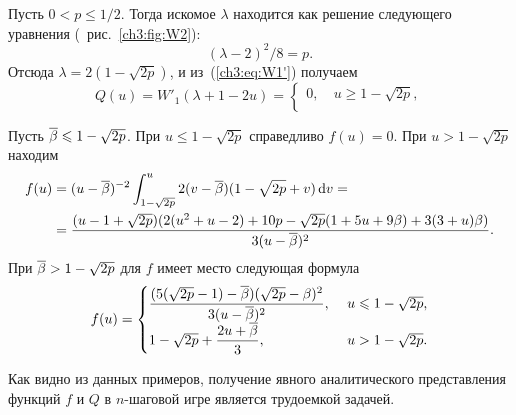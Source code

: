 {\begin{example}
  Пусть $0 < p \leq 1/2$.
  Тогда искомое $\lambda$ находится как решение следующего уравнения (\seename~рис.~\ref{ch3:fig:W2}):
  \begin{equation*}
    (\lambda - 2)^2/8 = p.
  \end{equation*}
  Отсюда $\lambda = 2(1-\sqrt{2p})$, и из~(\ref{ch3:eq:W1'}) получаем
  \begin{equation*}
    Q(u) = W'_1(\lambda + 1 - 2u) = \begin{cases}
      0,\ & u \geq 1 - \sqrt{2p},\\

    \end{cases}
  \end{equation*}
  
  Пусть ${{\overline{\beta}}} \leqslant 1 - \sqrt{2p}$.
  При $u \leq 1 - \sqrt{2p}$ справедливо $f(u) = 0$.
  При $u > 1 - \sqrt{2p}$ находим
  \begin{align*}
    f(u) 
    &= (u-{{\overline{\beta}}})^{-2} \int_{1-\sqrt{2p}}^u 2 (v-{{\overline{\beta}}}) (1-\sqrt{2p}+v) \mathop{}\!\mathrm{d} v = \\
    &= \frac{(u - 1 + \sqrt{2p})(2(u^2 + u - 2) + 10p - \sqrt{2p}(1+5u+9\beta) + 3(3+u)\beta)}{3(u-{{\overline{\beta}}})^2}.
  \end{align*}
  При ${{\overline{\beta}}} > 1 - \sqrt{2p}$ для $f$ имеет место следующая формула
  \begin{equation*}
    f(u) =
    \begin{cases}
      {\displaystyle \frac{(5(\sqrt{2p}-1) - \ensuremath{{{\overline{\beta}}}})(\sqrt{2p} - \ensuremath{\beta})^2}{3(u - \ensuremath{{{\overline{\beta}}}})^2}},\ & u \leqslant 1 - \sqrt{2p}, \\
      1 - \sqrt{2p} + {\displaystyle \frac{2u + {{\overline{\beta}}}}{3}},\ & u > 1 - \sqrt{2p}.
    \end{cases}
  \end{equation*}
\end{example}

Как видно из данных примеров, получение явного аналитического представления функций $f$ и $Q$ в $n$-шаговой игре является трудоемкой задачей.
}

